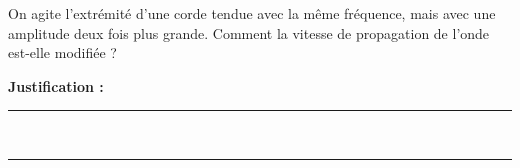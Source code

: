 On agite l'extrémité d'une corde tendue avec la même fréquence, mais avec une amplitude deux fois plus grande. Comment la vitesse de propagation de l'onde est-elle modifiée ?

\choices

\noindent\textbf{Justification :} \hrulefill \\[2.5ex]
\rule{\linewidth}{0.4pt} \\[2.5ex]
\rule{\linewidth}{0.4pt}
\vfill
